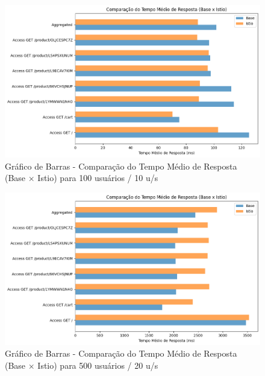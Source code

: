 \documentclass[12pt,a4paper]{report}
\begin{document}
\begin{figure}[H]
    \centering
    \includegraphics[width=1\linewidth]{figures/chart-locust_100.png}
    \caption{Gráfico de Barras - Comparação do Tempo Médio de Resposta (Base $\times$ Istio) para 100 usuários / 10 u/s}
    \label{fig:barchart-100}
\end{figure}

\begin{figure}[H]
    \centering
    \includegraphics[width=1\linewidth]{figures/chart-locust_500.png}
    \caption{Gráfico de Barras - Comparação do Tempo Médio de Resposta (Base $\times$ Istio) para 500 usuários / 20 u/s}
    \label{fig:barchart-500}
\end{figure}
\end{document}
